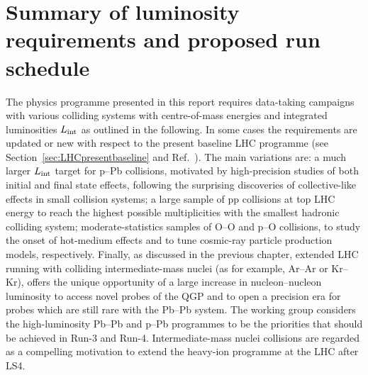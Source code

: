 \documentclass[../report.tex]{subfiles}
\begin{document}
\section{Summary of luminosity requirements and proposed run schedule}
\label{sec:schedule}

The physics programme presented in this report requires data-taking campaigns with various colliding systems with centre-of-mass energies and integrated luminosities $L_{\rm int}$ as outlined in the following. In some cases the requirements are updated or new with respect to the present baseline LHC programme (see Section~\ref{sec:LHCpresentbaseline} and Ref.~\cite{Abelevetal:2014cna}). The main variations are: a much larger $L_{\rm int}$ target for p--Pb collisions, motivated by high-precision studies of both initial and final state effects, following the surprising discoveries of collective-like effects in small collision systems; a large sample of pp collisions at top LHC energy to reach the highest possible multiplicities with the smallest hadronic colliding system; moderate-statistics samples of O--O and p--O collisions, to study the onset of hot-medium effects and to tune cosmic-ray particle production models, respectively. Finally, as discussed in the previous chapter, extended LHC running with colliding intermediate-mass nuclei (as for example, Ar--Ar or Kr--Kr), offers the unique opportunity of a large increase in nucleon--nucleon luminosity to access novel probes of the QGP and to open a precision era for probes which are still rare with the Pb--Pb system. The working group considers the high-luminosity Pb--Pb and p--Pb programmes to be the priorities that should be achieved in Run-3 and Run-4. Intermediate-mass nuclei collisions are regarded as a compelling motivation to extend the heavy-ion programme at the LHC after LS4.   
\end{document}
